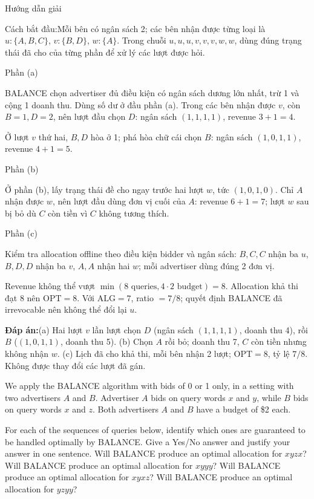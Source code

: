 \documentclass[10pt,a4paper,twocolumn]{article}
\makeatletter
\newcommand{\maptag}[1]{\phantomsection\@bsphack\protected@write\@auxout{}{\string\newlabel{#1}{{}{\thepage}{}{\@currentHref}{}}}\@esphack}
\newcommand{\key}[1]{#1:\enspace}
\newcommand{\solutionprompt}[1]{\par\addvspace{1pt}\noindent\key{Cách bắt đầu}#1\par\addvspace{2pt}}
\newcommand{\blocklabel}[1]{\par\noindent#1\par\nobreak}
\newcommand{\answer}[1]{%
  \par\addvspace{3pt}%
  \blocklabel{#1Hướng dẫn giải}}
\newcommand{\finalanswer}[1]{%
  \par\addvspace{3pt}\noindent\textbf{Đáp án:}\nobreak\enspace#1\par}
\newcommand{\guidepart}[1]{%
  \par\addvspace{1.5pt}%
  \blocklabel{Phần #1}}
\makeatother
\begin{document}
\answer{\maptag{answer:Pr28}}
\solutionprompt{Mỗi bên có ngân sách 2; các bên nhận được từng loại là $u:\{A,B,C\}$, $v:\{B,D\}$, $w:\{A\}$. Trong chuỗi $u,u,u,v,v,v,w,w$, dùng đúng trạng thái đã cho của từng phần để xử lý các lượt được hỏi.}
\guidepart{(a)}
\begin{guidesteps}
\item BALANCE chọn advertiser đủ điều kiện có ngân sách dương lớn nhất, trừ 1 và cộng 1 doanh thu. Dùng số dư ở đầu phần (a). Trong các bên nhận được $v$, còn $B=1,D=2$, nên lượt đầu chọn $D$: ngân sách $(1,1,1,1)$, revenue $3+1=4$.
\item Ở lượt $v$ thứ hai, $B,D$ hòa ở 1; phá hòa chữ cái chọn $B$: ngân sách $(1,0,1,1)$, revenue $4+1=5$.
\end{guidesteps}
\guidepart{(b)}
\begin{guidesteps}
\item Ở phần (b), lấy trạng thái đề cho ngay trước hai lượt $w$, tức $(1,0,1,0)$. Chỉ $A$ nhận được $w$, nên lượt đầu dùng đơn vị cuối của $A$: revenue $6+1=7$; lượt $w$ sau bị bỏ dù $C$ còn tiền vì $C$ không tương thích.
\end{guidesteps}
\guidepart{(c)}
\begin{guidesteps}
\item Kiểm tra allocation offline theo điều kiện bidder và ngân sách: $B,C,C$ nhận ba $u$, $B,D,D$ nhận ba $v$, $A,A$ nhận hai $w$; mỗi advertiser dùng đúng 2 đơn vị.
\item Revenue không thể vượt $\min(8\text{ queries},4\cdot2\text{ budget})=8$. Allocation khả thi đạt 8 nên $\mathrm{OPT}=8$. Với $\mathrm{ALG}=7$, ratio $=7/8$; quyết định BALANCE đã irrevocable nên không thể đổi lại $u$.
\end{guidesteps}
\finalanswer{(a) Hai lượt $v$ lần lượt chọn $D$ (ngân sách $(1,1,1,1)$, doanh thu 4), rồi $B$ ($(1,0,1,1)$, doanh thu 5). (b) Chọn $A$ rồi bỏ; doanh thu 7, $C$ còn tiền nhưng không nhận $w$. (c) Lịch đã cho khả thi, mỗi bên nhận 2 lượt; $\mathrm{OPT}=8$, tỷ lệ $7/8$. Không được thay đổi các lượt đã gán.}

We apply the BALANCE algorithm with bids of 0 or 1 only, in a setting with two advertisers $A$ and $B$. Advertiser $A$ bids on query words $x$ and $y$, while $B$ bids on query words $x$ and $z$. Both advertisers $A$ and $B$ have a budget of \$2 each.

For each of the sequences of queries below, identify which ones are guaranteed to be handled optimally by BALANCE. Give a Yes/No answer and justify your answer in one sentence.
 Will BALANCE produce an optimal allocation for $xyzx$?
 Will BALANCE produce an optimal allocation for $xyyy$?
 Will BALANCE produce an optimal allocation for $xyxz$?
 Will BALANCE produce an optimal allocation for $yzyy$?
\end{document}
